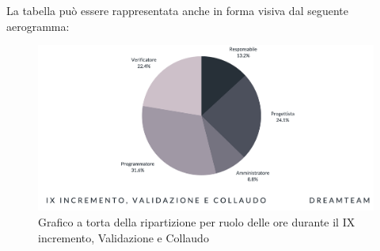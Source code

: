 La tabella può essere rappresentata anche in forma visiva dal seguente aerogramma:
\begin{figure}[H]
\centering
\includegraphics[scale=0.50]{Sezioni/SezioniPreventivo/grafici/validazione/Validazione_IX_incremento_costi.png}
\caption{Grafico a torta della ripartizione per ruolo delle ore durante il IX incremento, Validazione e Collaudo}
\end{figure}

\pagebreak

